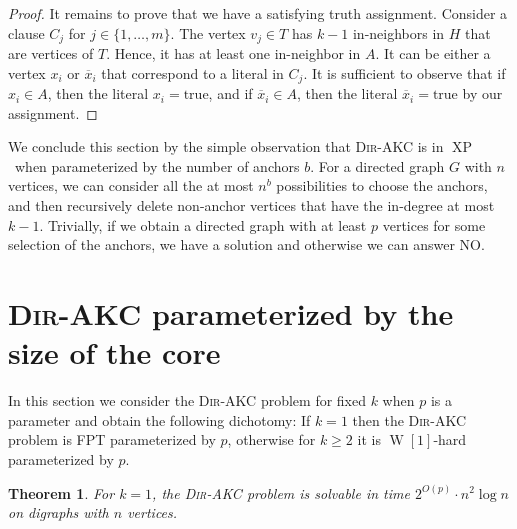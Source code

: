 \documentclass[11pt,a4paper]{article}
\newtheorem{theorem}{Theorem}
\DeclareMathOperator{\operatorClassXP}{XP}
\newcommand{\classXP}{\ensuremath{\operatorClassXP}}
\DeclareMathOperator{\operatorClassW}{W}
\newcommand{\classW}[1]{\ensuremath{\operatorClassW[#1]}}
\newcommand{\DAKC}{\textsc{Dir-AKC}\xspace}
\begin{document}
\begin{proof}
It remains to prove that we have a satisfying truth assignment. Consider a clause $C_j$ for $j\in\{1,\ldots,m\}$. The vertex
$v_j\in T$ has $k-1$ in-neighbors in $H$ that are vertices of $T$. Hence, it has at least one in-neighbor in $A$. It can be
either a vertex $x_i$ or $\overline{x}_i$ that correspond to a literal in $C_j$. It is sufficient to observe that if $x_i\in
A$, then the literal $x_i=\text{true}$, and if  $\overline{x}_i\in A$, then the literal $\overline{x}_i=\text{true}$ by our
assignment.
\end{proof}


We conclude this section by the simple observation that \DAKC is in \classXP\ when parameterized by the number of anchors $b$.
For a directed graph $G$ with $n$ vertices, we can consider all the at most $n^b$ possibilities to
choose the anchors, and then recursively delete non-anchor vertices that have the in-degree at most $k-1$. Trivially, if we
obtain a directed graph with at least $p$ vertices for some selection of the anchors, we have a solution and otherwise we can
answer NO.

\section{\DAKC parameterized by the size of the core}
\label{sec:saved}
\vskip-2mm
In this section we consider the \DAKC problem for fixed $k$ when $p$ is a parameter and obtain the following dichotomy: If
$k=1$ then the \DAKC problem is FPT parameterized by $p$, otherwise for $k\geq 2$ it is \classW1-hard parameterized by $p$.

\begin{theorem}\label{thm:fpt-d-1}
For $k=1$, the \DAKC problem is solvable in time $2^{O(p)}\cdot n^2\log n$ on digraphs with $n$ vertices.
\end{theorem}
\end{document}
